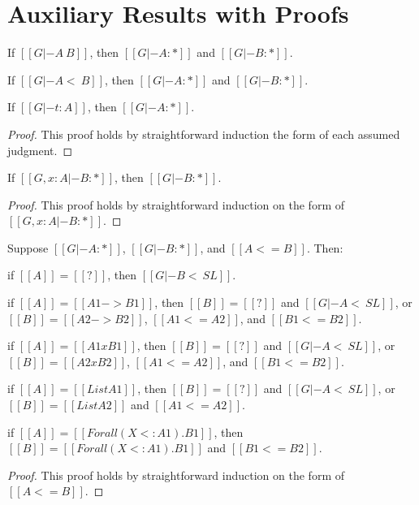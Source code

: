 \section{Auxiliary Results with Proofs}
\label{sec:auxiliary_results_with_proofs}
\begin{lemma}[Kinding]
  \label{lemma:kinding}
  \begin{enumR}
  \item[]
  \item If $[[G |- A ~ B]]$, then $[[G |- A : *]]$ and $[[G |- B : *]]$.
  \item If $[[G |- A <~ B]]$, then $[[G |- A : *]]$ and $[[G |- B : *]]$.
  \item If $[[G |- t : A]]$, then $[[G |- A : *]]$.
  \end{enumR}
\end{lemma}
\begin{proof}
  This proof holds by straightforward induction the form of each
  assumed judgment.
\end{proof}

\begin{lemma}
  \label{lemma:strengthening_for_kinding}
  If $[[G, x : A |- B : *]]$, then $[[G |- B : *]]$.
\end{lemma}
\begin{proof}
  This proof holds by straightforward induction on the form of $[[G, x : A |- B : *]]$.
\end{proof}

\begin{lemma}
  \label{lemma:inversion_of_type_precision}
  Suppose $[[G |- A : *]]$, $[[G |- B : *]]$, and $[[A <= B]]$.  Then:
  \begin{enumR}
  \item if $[[A]] = [[?]]$, then $[[G |- B <~ SL]]$.
  \item if $[[A]] = [[A1 -> B1]]$, then
    $[[B]] = [[?]]$ and $[[G |- A <~ SL]]$, or $[[B]] = [[A2 -> B2]]$, $[[A1 <= A2]]$, and $[[B1 <= B2]]$.
  \item if $[[A]] = [[A1 x B1]]$, then
    $[[B]] = [[?]]$ and $[[G |- A <~ SL]]$, or $[[B]] = [[A2 x B2]]$, $[[A1 <= A2]]$, and $[[B1 <= B2]]$.
  \item if $[[A]] = [[List A1]]$, then
    $[[B]] = [[?]]$ and $[[G |- A <~ SL]]$, or $[[B]] = [[List A2]]$ and $[[A1 <= A2]]$.
  \item if $[[A]] = [[Forall (X <: A1).B1]]$, then
    $[[B]] = [[Forall (X <: A1).B1]]$ and $[[B1 <= B2]]$.
  \end{enumR}
\end{lemma}
\begin{proof}
  This proof holds by straightforward induction on the form of $[[A <= B]]$.
\end{proof}

